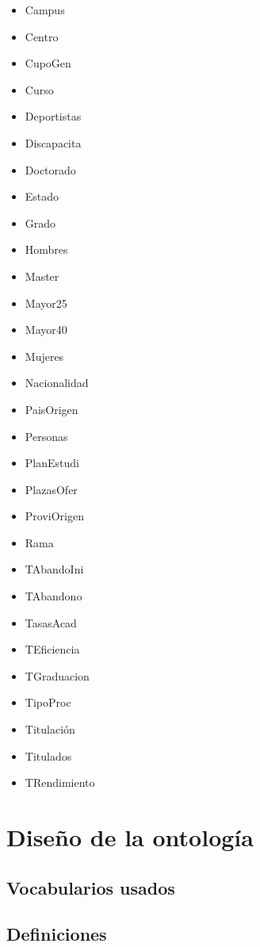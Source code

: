 \begin{itemize}
		\item Campus
		\item Centro
		\item CupoGen
		\item Curso
		\item Deportistas
		\item Discapacita
		\item Doctorado
		\item Estado
		\item Grado
		\item Hombres
		\item Master
		\item Mayor25
		\item Mayor40
		\item Mujeres
		\item Nacionalidad
		\item PaisOrigen
		\item Personas
		\item PlanEstudi
		\item PlazasOfer
		\item ProviOrigen
		\item Rama
		\item TAbandoIni
		\item TAbandono
		\item TasasAcad
		\item TEficiencia
		\item TGraduacion
		\item TipoProc
		\item Titulación
		\item Titulados
		\item TRendimiento
\end{itemize}

\section{Diseño de la ontología}

\subsection{Vocabularios usados}

\subsection{Definiciones}